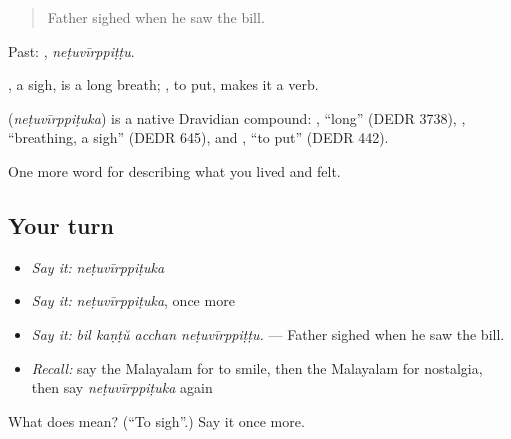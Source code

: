 \begin{quote}
Father sighed when he saw the bill.
\end{quote}

Past: , \emph{neṭuvīrppiṭṭu}.

, a sigh, is a long breath; , to put, makes it a verb.

\begin{cousinweb}
\textbf{} (\emph{neṭuvīrppiṭuka}) is a native Dravidian compound: , \textquotedblleft{}long\textquotedblright{} (DEDR 3738), , \textquotedblleft{}breathing, a sigh\textquotedblright{} (DEDR 645), and , \textquotedblleft{}to put\textquotedblright{} (DEDR 442).
\end{cousinweb}

\begin{grammarlens}[title={What you've built}]
One more word for describing what you lived and felt.
\end{grammarlens}

\subsection*{Your turn}
\begin{itemize}
\raggedright
  \item \emph{Say it:} \emph{neṭuvīrppiṭuka}
  \item \emph{Say it:} \emph{neṭuvīrppiṭuka}, once more
  \item \emph{Say it:} \emph{bil kaṇṭŭ acchan neṭuvīrppiṭṭu.} — Father sighed when he saw the bill.
  \item \emph{Recall:} say the Malayalam for to smile, then the Malayalam for nostalgia, then say \emph{neṭuvīrppiṭuka} again
\end{itemize}

\begin{tcolorbox}[breakable,colback=teal!4,colframe=teal!35!black,title={Before you move on}]
What does  mean? (\textquotedblleft{}To sigh\textquotedblright{}.) Say it once more.
\end{tcolorbox}
